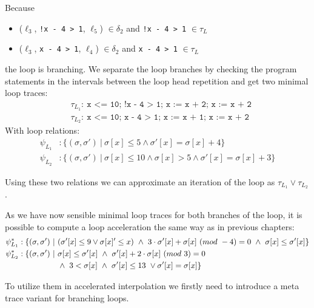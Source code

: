 \documentclass{article}
\begin{document}
Because \begin{itemize}
	\item ($\ell_3$, \texttt{!x - 4 > 1}, $\ell_5$) $\in \delta_2$ and \texttt{!x - 4 > 1} $\in \tau_L$
	\item ($\ell_3$, \texttt{x - 4 > 1}, $\ell_4$) $\in \delta_2$ and \texttt{x - 4 > 1} $\in \tau_L$
\end{itemize}
the loop is branching.
We separate the loop branches by checking the program statements in the intervals between the loop head repetition and get two minimal loop traces:
\begin{align*}
	&\tau_{L_1}:\ \texttt{x <= 10; !x - 4 > 1; x := x + 2;\ x := x + 2} \\
	&\tau_{L_2}:\ \texttt{x <= 10; x - 4 > 1; x := x + 1; x := x + 2}
\end{align*}
With loop relations:
\begin{align*}
	\psi_{L_{1}} &: \{(\sigma, \sigma')\ |\ \sigma[x] \leq 5 \land  \sigma'[x] = \sigma[x] + 4 \} \\
	\psi_{L_{2}}&: \{(\sigma, \sigma')\ |\ \sigma[x] \leq 10 \land \sigma[x] > 5 \land  \sigma'[x] = \sigma[x] + 3 \}
\end{align*}

Using these two relations we can approximate an iteration of the loop as $\tau_{L_1} \lor \tau_{L_2}$. \\ \par
As we have now sensible minimal loop traces for both branches of the loop, it is possible to compute a loop acceleration the same way as in previous chapters:
\begin{align*}
	\psi_{L_{1}}^* &: \{(\sigma, \sigma')\ |\ (\sigma'[x] \leq 9 \lor \sigma[x]' \leq x)\ \land\ 3\cdot \sigma'[x] + \sigma[x]\ (mod\ -4) = 0\ \land\ \sigma[x] \leq \sigma'[x] \} \\
	\psi_{L_{2}}^* &: \{ (\sigma, \sigma')\ | \ \sigma[x] \leq \sigma'[x]\ \land\ \sigma'[x] + 2 \cdot \sigma[x]\ (mod\ 3) = 0 \\
	&\hspace*{1.75cm} \land\ 3 < \sigma[x]\ \land\ \sigma'[x] \leq 13 \ \lor \sigma'[x] = \sigma[x]\}
\end{align*}

To utilize them in accelerated interpolation we firstly need to introduce a meta trace variant for branching loops.
\end{document}
